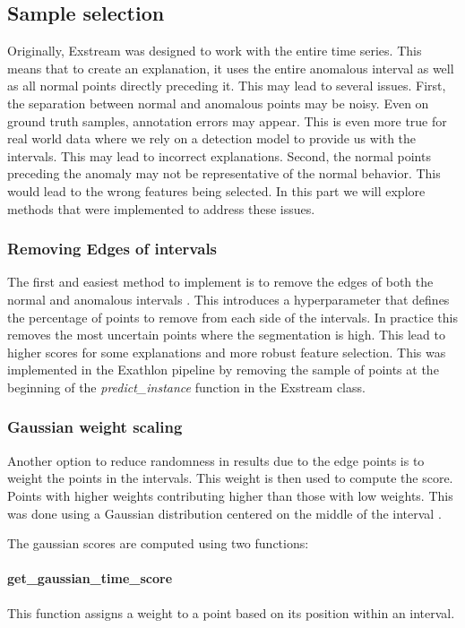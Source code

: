 \documentclass[11pt]{article}
\begin{document}
\subsection{Sample selection}
Originally, Exstream was designed to work with the entire time series. This means that to create an explanation, it uses the entire anomalous interval as well as all normal points directly preceding it. This may lead to several issues. First, the separation between normal and anomalous points may be noisy. Even on ground truth samples, annotation errors may appear. This is even more true for real world data where we rely on a detection model to provide us with the intervals. This may lead to incorrect explanations. Second, the normal points preceding the anomaly may not be representative of the normal behavior. This would lead to the wrong features being selected. 
In this part we will explore methods that were implemented to address these issues.

\subsubsection{Removing Edges of intervals}
The first and easiest method to implement is to remove the edges of both the normal and anomalous intervals \cite{Remi_thesis}. This introduces a hyperparameter that defines the percentage of points to remove from each side of the intervals. In practice this removes the most uncertain points where the segmentation is high. This lead to higher scores for some explanations and more robust feature selection.
This was implemented in the Exathlon pipeline \cite{exathlon-private} by removing the sample of points at the beginning of the \textit{predict\_instance} function in the Exstream class.




\subsubsection{Gaussian weight scaling}
Another option to reduce randomness in results due to the edge points is to weight the points in the intervals. This weight is then used to compute the score. Points with higher weights contributing higher than those with low weights. This was done using a Gaussian distribution centered on the middle of the interval \cite{Mija_thesis}.



The gaussian scores are computed using two functions: 
\paragraph{get\_gaussian\_time\_score}
This function assigns a weight to a point based on its position within an interval.
\end{document}

